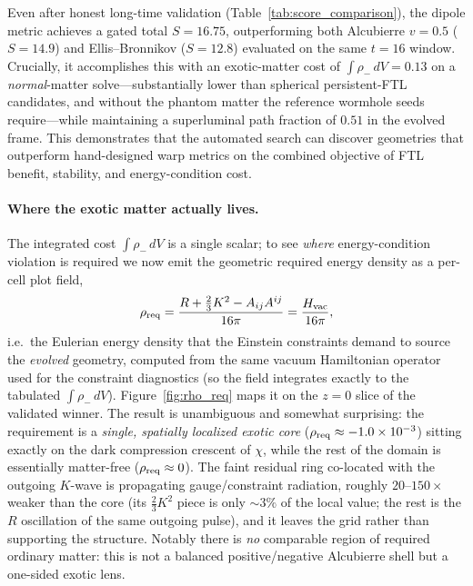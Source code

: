 \documentclass[twocolumn,floatfix,aps,prd,nofootinbib]{revtex4-2}
\begin{document}
Even after honest long-time validation (Table~\ref{tab:score_comparison}), the dipole metric achieves a gated total $S=16.75$, outperforming both Alcubierre $v=0.5$ ($S=14.9$) and Ellis--Bronnikov ($S=12.8$) evaluated on the same $t=16$ window.  Crucially, it accomplishes this with an exotic-matter cost of $\int\rho_{-}\,dV=0.13$ on a \emph{normal}-matter solve---substantially lower than spherical persistent-FTL candidates, and without the phantom matter the reference wormhole seeds require---while maintaining a superluminal path fraction of $0.51$ in the evolved frame.  This demonstrates that the automated search can discover geometries that outperform hand-designed warp metrics on the combined objective of FTL benefit, stability, and energy-condition cost.

\paragraph{Where the exotic matter actually lives.}
The integrated cost $\int\rho_-\,dV$ is a single scalar; to see \emph{where} energy-condition violation is required we now emit the geometric required energy density as a per-cell plot field,
\begin{equation}
\rho_{\rm req}=\frac{R+\tfrac{2}{3}K^2-A_{ij}A^{ij}}{16\pi}=\frac{H_{\rm vac}}{16\pi},
\label{eq:rho_req}
\end{equation}
i.e.\ the Eulerian energy density that the Einstein constraints demand to source the \emph{evolved} geometry, computed from the same vacuum Hamiltonian operator used for the constraint diagnostics (so the field integrates exactly to the tabulated $\int\rho_-\,dV$).  Figure~\ref{fig:rho_req} maps it on the $z=0$ slice of the validated winner.  The result is unambiguous and somewhat surprising: the requirement is a \emph{single, spatially localized exotic core} ($\rho_{\rm req}\approx-1.0\times10^{-3}$) sitting exactly on the dark compression crescent of $\chi$, while the rest of the domain is essentially matter-free ($\rho_{\rm req}\approx0$).  The faint residual ring co-located with the outgoing $K$-wave is propagating gauge/constraint radiation, roughly $20$--$150\times$ weaker than the core (its $\tfrac{2}{3}K^2$ piece is only $\sim3\%$ of the local value; the rest is the $R$ oscillation of the same outgoing pulse), and it leaves the grid rather than supporting the structure.  Notably there is \emph{no} comparable region of required ordinary matter: this is not a balanced positive/negative Alcubierre shell but a one-sided exotic lens.
\end{document}
